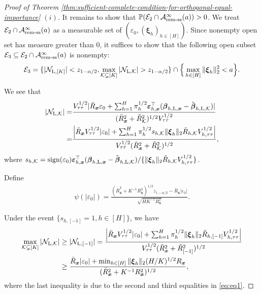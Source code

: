 \documentclass[12pt]{article}
\newcommand{\Lin}{\textnormal{L}}
\newcommand{\Prob}{\mathbb{P}}
\newcommand{\mk}{\mathcal{K}}
\newcommand{\remss}{\textnormal{rem-ss}}
\newcommand{\bs}{\boldsymbol}
\begin{document}
\begin{proof}[Proof of Theorem \ref{thm:sufficient-complete-condition-for-orthogonal-equal-importance} $(i)$]
It remains to show that $\Prob(\mathcal{E}_2\cap\mathcal{A}_{\remss}^{\infty}(a))>0$. We treat $\mathcal{E}_2\cap\mathcal{A}_{\remss}^{\infty}(a)$ as a measurable set of $(\varepsilon_0,(\bs{\xi}_{h})_{h\in [H]} )$.  Since nonempty open set has measure greater than $0$, it suffices to show that the following open subset $\mathcal{E}_3\subseteq \mathcal{E}_2\cap\mathcal{A}_{\remss}^{\infty}(a)$ is nonempty: 
\[
\mathcal{E}_3 =\{|\mathcal{N}_{\Lin, [K]}|< z_{1-\alpha/2}, \max_{\mk \subsetneq [K]} |\mathcal{N}_{\Lin, \mk}| > z_{1-\alpha/2} \} \cap \Big\{\max_{h\in [H]} \|\bs{\xi}_h\|_2^2 <a\Big\}. 
\]

We see that 
 \begin{align*}
    |\mathcal{N}_{\Lin,\mk}| =& \frac{V_{\tau\tau}^{1/2}|\bar{R}_{\bs{x}}\varepsilon_0 + \sum_{h=1}^H \pi_{h}^{1/2}\bs{\varepsilon}_{h,\bs{x}}^\top (\bs{\beta}_{h, \Lin , \bs{x}}-\tilde{\bs{\beta}}_{h,\Lin,\mk})|}{(\bar{R}^2_{\bs{x}}+\tilde{R}_{ \mk}^2)^{1/2}V_{\tau\tau}^{1/2}} \\
    =& \frac{\Big|\bar{R}_{\bs{x}}V_{\tau\tau}^{1/2}|\varepsilon_0|+\sum_{h=1}^H \pi_{h}^{1/2} s_{h,\mk}\|\bs{\xi}_h\|_2 \tilde{R}_{h,\mk}V_{h,\tau\tau}^{1/2}\Big|}{V_{\tau\tau}^{1/2}(\bar{R}_{\bs{x}}^2 + \tilde{R}^2_{\mk})^{1/2}}, 
 \end{align*}
where $s_{h,\mk} = \operatorname{sign}(\varepsilon_{0})\bs{\varepsilon}_{h,\bs{x}}^\top (\bs{\beta}_{h, \Lin , \bs{x}}-\tilde{\bs{\beta}}_{h,\Lin,\mk})/\{\|\bs{\xi}_{h}\|_2\tilde{R}_{h,\mk}V_{h,\tau\tau}^{1/2}\}$.

Define 
\begin{align*}
    \psi(|\varepsilon_0|) = \frac{(\bar{R}_{\bs{x}}^2 + K^{-1} R^2_{\bs{x}})^{1/2}z_{1-\alpha/2}-\bar{R}_{\bs{x}}|\varepsilon_0|}{\sqrt{H K^{-1} R^2_{\bs{x}}}}.
\end{align*}

Under the event $\{s_{h,[-1]}=1, h \in [H]\}$, we have
\begin{align*}
    \max_{\mk \subsetneq [K]} |\mathcal{N}_{\Lin, \mk}| &\geq |\mathcal{N}_{\Lin, [-1]}| = \frac{\Big|\bar{R}_{\bs{x}}V_{\tau\tau}^{1/2}|\varepsilon_0|+\sum_{h=1}^H \pi_{h}^{1/2}\|\bs{\xi}_h\|_2 \tilde{R}_{h,[-1]}V_{h,\tau\tau}^{1/2}\Big|}{V_{\tau\tau}^{1/2}(\bar{R}_{\bs{x}}^2 + \tilde{R}^2_{[-1]})^{1/2}}\\
    &\geq \frac{\bar{R}_{\bs{x}}|\varepsilon_0|+\min_{h\in [H]} \|\bs{\xi}_h\|_2(H/K)^{1/2}R_{\bs{x}}}{(\bar{R}_{\bs{x}}^2 + K^{-1}R^2_{\bs{x}})^{1/2}},
\end{align*}
where the last inequality is due to the second and third equalities in \eqref{eq:eq1}.


\end{proof}
\end{document}
